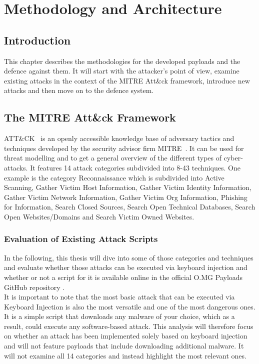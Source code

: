 \chapter{Methodology and Architecture} \label{Methodology}

\section{Introduction}

This chapter describes the methodologies for the developed payloads and the defence against them. It will start with the attacker's point of view, examine existing attacks in the context of the MITRE Att\&ck framework, introduce new attacks and then move on to the defence system.


\section{The MITRE Att\&ck Framework}

ATT\&CK~\cite{MITREATTCK} is an openly accessible knowledge base of adversary tactics and techniques developed by the security advisor firm MITRE~\cite{WhoWeAre}. It can be used for threat modelling and to get a general overview of the different types of cyber-attacks.
It features 14 attack categories subdivided into 8-43 techniques. One example is the category Reconnaissance which is subdivided into Active Scanning,
Gather Victim Host Information, Gather Victim Identity Information, Gather Victim Network Information, Gather Victim Org Information,
Phishing for Information, Search Closed Sources, Search Open Technical Databases, Search Open Websites/Domains and Search Victim Owned Websites.



\subsection{Evaluation of Existing Attack Scripts}

In the following, this thesis will dive into some of those categories and techniques and evaluate whether those attacks can be executed via keyboard injection
and whether or not a script for it is available online in the official O.MG Payloads GitHub repository \cite{Hak5Omgpayloads2024}. \\
It is important to note that the most basic attack that can be executed via Keyboard Injection is also the most versatile and one of the most dangerous ones.
It is a simple script that downloads any malware of your choice, which as a result, could execute any software-based attack.
This analysis will therefore focus on whether an attack has been implemented solely based on keyboard injection and will not feature payloads that include downloading additional malware.
It will not examine all 14 categories and instead highlight the most relevant ones.

